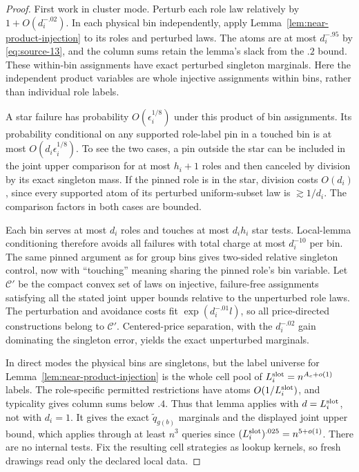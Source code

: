 \begin{proof}
First work in cluster mode. Perturb each role law relatively by
\(1+O(d_i^{-.02})\). In each physical bin independently, apply
Lemma~\ref{lem:near-product-injection} to its roles and perturbed laws.
The atoms are at most \(d_i^{-.95}\) by \eqref{eq:source-13}, and the
column sums retain the lemma's slack from the \(.2\) bound. These
within-bin assignments have exact perturbed singleton marginals. Here the
independent product variables are whole injective assignments within
bins, rather than individual role labels.

A star failure has probability \(O(\epsilon_i^{1/8})\) under this
product of bin assignments. Its probability conditional on any supported
role-label pin in a touched bin is at most
\(O(d_i\epsilon_i^{1/8})\). To see the two cases, a pin outside the
star can be included in the joint upper comparison for at most
\(h_i+1\) roles and then canceled by division by its exact singleton
mass. If the pinned role is in the star, division costs \(O(d_i)\),
since every supported atom of its perturbed uniform-subset law is
\(\gtrsim1/d_i\). The comparison factors in both cases are bounded.

Each bin serves at most \(d_i\) roles and touches at most \(d_i h_i\)
star tests. Local-lemma conditioning therefore avoids all failures with
total charge at most \(d_i^{-10}\) per bin. The same pinned argument as
for group bins gives two-sided relative singleton control, now with
``touching'' meaning sharing the pinned role's bin variable. Let
\(\mathcal C'\) be the compact convex set of laws on injective,
failure-free assignments satisfying all the stated joint upper bounds
relative to the unperturbed role laws. The perturbation and avoidance
costs fit \(\exp(d_i^{-.01}l)\), so all price-directed constructions
belong to \(\mathcal C'\). Centered-price separation, with the
\(d_i^{-.02}\) gain dominating the singleton error, yields the exact
unperturbed marginals.

In direct modes the physical bins are singletons, but the label universe
for Lemma~\ref{lem:near-product-injection} is the whole cell pool of
\(L_i^{\rm slot}=n^{A_c+o(1)}\) labels. The role-specific permitted
restrictions have atoms \(O(1/L_i^{\rm slot})\), and typicality gives
column sums below \(.4\). Thus that lemma applies with
\(d=L_i^{\rm slot}\), not with \(d_i=1\). It gives the exact
\(\widetilde q_{g(b)}\) marginals and the displayed joint upper bound,
which applies through at least \(n^3\) queries since
\((L_i^{\rm slot})^{.025}=n^{5+o(1)}\). There are no internal tests.
Fix the resulting cell strategies as lookup kernels, so fresh drawings
read only the declared local data.
\end{proof}

